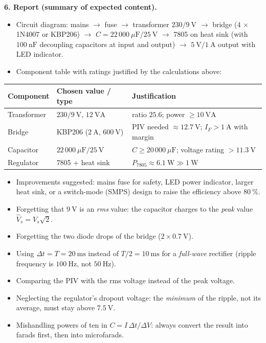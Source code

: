 \documentclass[11pt]{article}
\begin{document}
\textbf{6. Report (summary of expected content).}\par
\begin{itemize}
\item Circuit diagram: mains $\rightarrow$ fuse $\rightarrow$ transformer $230/9\ \mathrm{V}$ $\rightarrow$ bridge (4 $\times$ 1N4007 or KBP206) $\rightarrow$ $C = 22\,000\ \mu\mathrm{F}/25\ \mathrm{V}$ $\rightarrow$ 7805 on heat sink (with $100\ \mathrm{nF}$ decoupling capacitors at input and output) $\rightarrow$ $5\ \mathrm{V}/1\ \mathrm{A}$ output with LED indicator.
\item Component table with ratings justified by the calculations above:
\end{itemize}
\begin{center}
\begin{tabularx}{\linewidth}{|l|X|X|}
\hline
\rowcolor{popblueL} \textbf{Component} & \textbf{Chosen value / type} & \textbf{Justification} \\
\hline
Transformer & $230/9\ \mathrm{V}$, $12\ \mathrm{VA}$ & ratio $25.6$; power $\geq 10\ \mathrm{VA}$ \\
\hline
Bridge & KBP206 ($2\ \mathrm{A}$, $600\ \mathrm{V}$) & PIV needed $\approx 12.7\ \mathrm{V}$; $I_F > 1\ \mathrm{A}$ with margin \\
\hline
Capacitor & $22\,000\ \mu\mathrm{F} / 25\ \mathrm{V}$ & $C \geq 20\,000\ \mu\mathrm{F}$; voltage rating $> 11.3\ \mathrm{V}$ \\
\hline
Regulator & 7805 + heat sink & $P_{7805} \approx 6.1\ \mathrm{W} \gg 1\ \mathrm{W}$ \\
\hline
\end{tabularx}
\end{center}
\begin{itemize}
\item Improvements suggested: mains fuse for safety, LED power indicator, larger heat sink, or a switch-mode (SMPS) design to raise the efficiency above $80\ \%$.
\end{itemize}

\begin{attention}
\begin{itemize}
\item Forgetting that $9\ \mathrm{V}$ is an \emph{rms} value: the capacitor charges to the \emph{peak} value $\hat{V}_s = V_s\sqrt{2}$.
\item Forgetting the two diode drops of the bridge ($2 \times 0.7\ \mathrm{V}$).
\item Using $\Delta t = T = 20\ \mathrm{ms}$ instead of $T/2 = 10\ \mathrm{ms}$ for a \emph{full-wave} rectifier (ripple frequency is $100\ \mathrm{Hz}$, not $50\ \mathrm{Hz}$).
\item Comparing the PIV with the rms voltage instead of the peak voltage.
\item Neglecting the regulator's dropout voltage: the \emph{minimum} of the ripple, not its average, must stay above $7.5\ \mathrm{V}$.
\item Mishandling powers of ten in $C = I\,\Delta t/\Delta V$: always convert the result into farads first, then into microfarads.
\end{itemize}
\end{attention}
\end{document}
